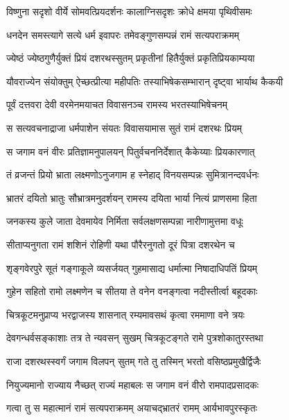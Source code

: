 \twolineshloka
{विष्णुना सदृशो वीर्ये सोमवत्प्रियदर्शनः}
{कालाग्निसदृशः क्रोधे क्षमया पृथिवीसमः} %

\twolineshloka
{धनदेन समस्त्यागे सत्ये धर्म इवापरः}
{तमेवङ्गुणसम्पन्नं रामं सत्यपराक्रमम्} %

\twolineshloka
{ज्येष्ठं ज्येष्ठगुणैर्युक्तं प्रियं दशरथस्सुतम्}
{प्रकृतीनां हितैर्युक्तं प्रकृतिप्रियकाम्यया} %

\twolineshloka
{यौवराज्येन संयोक्तुम् ऐच्छत्प्रीत्या महीपतिः}
{तस्याभिषेकसम्भारान् दृष्ट्वा भार्याथ कैकयी} %

\twolineshloka
{पूर्वं दत्तवरा देवी वरमेनमयाचत}
{विवासनञ्च रामस्य भरतस्याभिषेचनम्} %

\twolineshloka
{स सत्यवचनाद्राजा धर्मपाशेन संयतः}
{विवासयामास सुतं रामं दशरथः प्रियम्} %

\twolineshloka
{स जगाम वनं वीरः प्रतिज्ञामनुपालयन्}
{पितुर्वचननिर्देशात् कैकेय्याः प्रियकारणात्} %

\twolineshloka
{तं व्रजन्तं प्रियो भ्राता लक्ष्मणोऽनुजगाम ह}
{स्नेहाद् विनयसम्पन्नः सुमित्रानन्दवर्धनः} %

\twolineshloka
{भ्रातरं दयितो भ्रातुः सौभ्रात्रमनुदर्शयन्}
{रामस्य दयिता भार्या नित्यं प्राणसमा हिता} %

\twolineshloka
{जनकस्य कुले जाता देवमायेव निर्मिता}
{सर्वलक्षणसम्पन्ना नारीणामुत्तमा वधूः} %

\twolineshloka
{सीताप्यनुगता रामं शशिनं रोहिणी यथा}
{पौरैरनुगतो दूरं पित्रा दशरथेन च} %

\twolineshloka
{शृङ्गवेरपुरे सूतं गङ्गाकूले व्यसर्जयत्}
{गुहमासाद्य धर्मात्मा निषादाधिपतिं प्रियम्} %

\twolineshloka
{गुहेन सहितो रामो लक्ष्मणेन च सीतया}
{ते वनेन वनङ्गत्वा नदीस्तीर्त्वा बहूदकाः} %

\twolineshloka
{चित्रकूटमनुप्राप्य भरद्वाजस्य शासनात्}
{रम्यमावसथं कृत्वा रममाणा वने त्रयः} %

\twolineshloka
{देवगन्धर्वसङ्काशाः तत्र ते न्यवसन् सुखम्}
{चित्रकूटङ्गते रामे पुत्रशोकातुरस्तथा} %

\twolineshloka
{राजा दशरथस्स्वर्गं जगाम विलपन् सुतम्}
{गते तु तस्मिन् भरतो वसिष्ठप्रमुखैर्द्विजैः} %

\twolineshloka
{नियुज्यमानो राज्याय नैच्छत् राज्यं महाबलः}
{स जगाम वनं वीरो रामपादप्रसादकः} %

\twolineshloka
{गत्वा तु स महात्मानं रामं सत्यपराक्रमम्}
{अयाचद्भ्रातरं रामम् आर्यभावपुरस्कृतः} %


